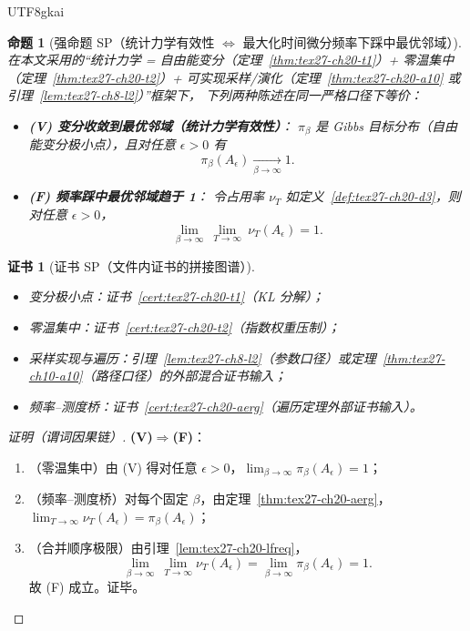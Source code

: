 \documentclass[12pt]{article}
\newtheorem{proposition}{命题}[section]
\newtheorem{Certificate}{证书}[section]
\begin{document}
\begin{CJK*}{UTF8}{gkai}
\begin{proposition}[强命题 SP（统计力学有效性 $\Leftrightarrow$ 最大化时间微分频率下踩中最优邻域）]
\label{prop:tex27-ch20-sp}
在本文采用的“统计力学 = 自由能变分（定理~\ref{thm:tex27-ch20-t1}）+ 零温集中（定理~\ref{thm:tex27-ch20-t2}）+ 可实现采样/演化（定理~\ref{thm:tex27-ch20-a10}
  或引理~\ref{lem:tex27-ch8-l2}）”框架下，
下列两种陈述在同一严格口径下等价：
\begin{itemize}
  \item \textbf{(V) 变分收敛到最优邻域（统计力学有效性）}：
  $\pi_\beta$ 是 Gibbs 目标分布（自由能变分极小点），且对任意 $\epsilon>0$ 有
  \[
    \pi_\beta(A_\epsilon)\xrightarrow[\beta\to\infty]{}1.
  \]
  \item \textbf{(F) 频率踩中最优邻域趋于 1}：
  令占用率 $\nu_T$ 如定义~\ref{def:tex27-ch20-d3}，则对任意 $\epsilon>0$，
  \[
    \lim_{\beta\to\infty}\ \lim_{T\to\infty}\ \nu_T(A_\epsilon)=1.
  \]
\end{itemize}
\end{proposition}

\begin{Certificate}[证书 SP（文件内证书的拼接图谱）]
\label{cert:tex27-ch20-sp}
\begin{itemize}
  \item 变分极小点：证书~\ref{cert:tex27-ch20-t1}（KL 分解）；
  \item 零温集中：证书~\ref{cert:tex27-ch20-t2}（指数权重压制）；
  \item 采样实现与遍历：引理~\ref{lem:tex27-ch8-l2}（参数口径）或定理~\ref{thm:tex27-ch10-a10}（路径口径）的外部混合证书输入；
  \item 频率--测度桥：证书~\ref{cert:tex27-ch20-aerg}（遍历定理外部证书输入）。
\end{itemize}
\end{Certificate}

\begin{proof}[证明（谓词因果链）]
\textbf{(V)$\Rightarrow$(F)}：
\begin{enumerate}
  \item（零温集中）由 (V) 得对任意 $\epsilon>0$，$\lim_{\beta\to\infty}\pi_\beta(A_\epsilon)=1$；
  \item（频率--测度桥）对每个固定 $\beta$，由定理~\ref{thm:tex27-ch20-aerg}，
  $\lim_{T\to\infty}\nu_T(A_\epsilon)=\pi_\beta(A_\epsilon)$；
  \item（合并顺序极限）由引理~\ref{lem:tex27-ch20-lfreq}，
  \[
    \lim_{\beta\to\infty}\ \lim_{T\to\infty}\nu_T(A_\epsilon)
    =
    \lim_{\beta\to\infty}\pi_\beta(A_\epsilon)
    =1.
  \]
  故 (F) 成立。证毕。
\end{enumerate}


\end{proof}
\end{CJK*}
\end{document}
